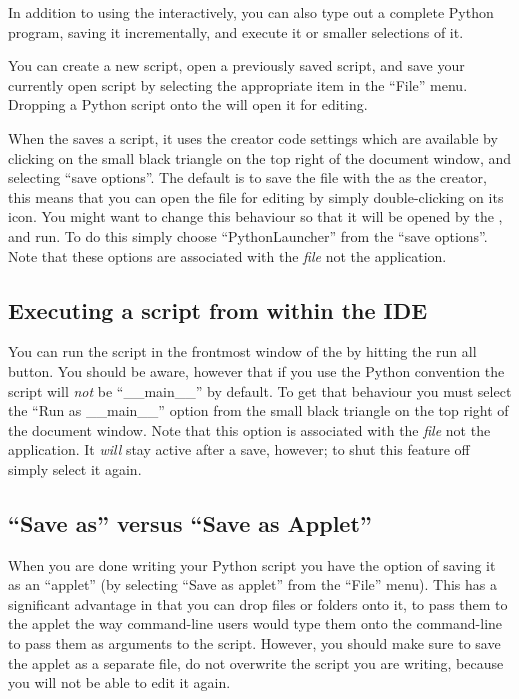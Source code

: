 In addition to using the  interactively, you can
also type out a complete Python program, saving it incrementally, and
execute it or smaller selections of it.

You can create a new script, open a previously saved script, and save
your currently open script by selecting the appropriate item in the
``File'' menu. Dropping a Python script onto the
 will open it for editing.

When the  saves a script, it uses the creator code
settings which are available by clicking on the small black triangle
on the top right of the document window, and selecting ``save
options''. The default is to save the file with the  as the creator, this means that you can open the file for editing
by simply double-clicking on its icon. You might want to change this
behaviour so that it will be opened by the
, and run. To do this simply choose
``PythonLauncher'' from the ``save options''. Note that these
options are associated with the \emph{file} not the application.


\subsection{Executing a script from within the IDE
            \label{IDEexecution}}

You can run the script in the frontmost window of the  by hitting the run all button.  You should be aware, however that
if you use the Python convention  the
script will \emph{not} be ``__main__'' by default. To get that
behaviour you must select the ``Run as __main__'' option from the
small black triangle on the top right of the document window.  Note
that this option is associated with the \emph{file} not the
application. It \emph{will} stay active after a save, however; to shut
this feature off simply select it again.
 

\subsection{``Save as'' versus ``Save as Applet''
            \label{IDEapplet}}

When you are done writing your Python script you have the option of
saving it as an ``applet'' (by selecting ``Save as applet'' from the
``File'' menu). This has a significant advantage in that you can drop
files or folders onto it, to pass them to the applet the way
command-line users would type them onto the command-line to pass them
as arguments to the script. However, you should make sure to save the
applet as a separate file, do not overwrite the script you are
writing, because you will not be able to edit it again.

